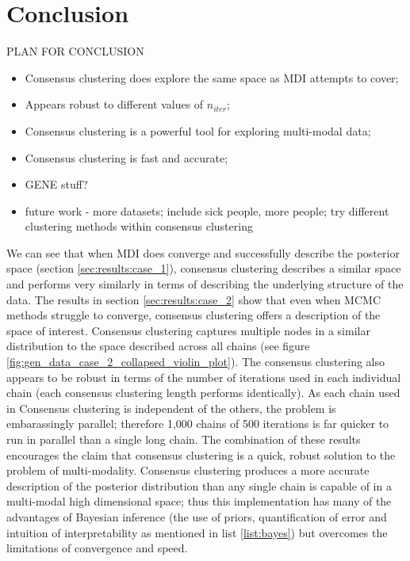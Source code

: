 \documentclass[12pt]{article} %
\begin{document}
	\section{Conclusion}
	PLAN FOR CONCLUSION
	\begin{itemize}
		\item Consensus clustering does explore the same space as MDI attempts to cover;
		\item Appears robust to different values of $n_{iter}$;
		\item Consensus clustering is a powerful tool for exploring multi-modal data;
		\item Consensus clustering is fast and accurate;
		\item GENE stuff?
		\item future work - more datasets; include sick people, more people; try different clustering methods within consensus clustering
	\end{itemize}
	
	We can see that when MDI does converge and successfully describe the posterior space (section \ref{sec:results:case_1}), consensus clustering describes a similar space and performs very similarly in terms of describing the underlying structure of the data. The results in section \ref{sec:results:case_2} show that even when MCMC methods struggle to converge, consensus clustering offers a description of the space of interest. Consensus clustering captures multiple nodes in a similar distribution to the space described across all chains (see figure \ref{fig:gen_data_case_2_collapsed_violin_plot}). The consensus clustering also appears to be robust in terms of the number of iterations used in each individual chain (each consensus clustering length performs identically). As each chain used in Consensus clustering is independent of the others, the problem is embarassingly parallel; therefore 1,000 chains of 500 iterations is far quicker to run in parallel than a single long chain.
	The combination of these results encourages the claim that consensus clustering is a quick, robust solution to the problem of multi-modality. Consensus clustering produces a more accurate description of the posterior distribution than any single chain is capable of in a multi-modal high dimensional space; thus this implementation has many of the advantages of Bayesian inference (the use of priors, quantification of error and intuition of interpretability as mentioned in list \ref{list:bayes}) but overcomes the limitations of convergence and speed.
	
\end{document}
